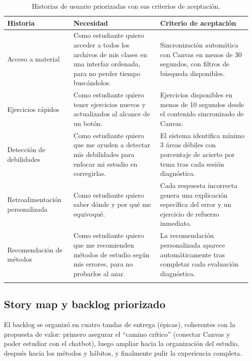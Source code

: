 \documentclass[11pt,a4paper]{article}
\begin{document}
\begin{longtable}{@{}p{4.6cm} p{5.4cm} p{4.5cm}@{}}
\toprule
\textbf{Historia} & \textbf{Necesidad} & \textbf{Criterio de aceptaci\'on} \\
\midrule
\endhead
Acceso a material & Como estudiante quiero acceder a todos los archivos de mis clases en una interfaz ordenada, para no perder tiempo busc\'andolos. & Sincronizaci\'on autom\'atica con Canvas en menos de 30 segundos, con filtros de b\'usqueda disponibles. \\
Ejercicios r\'apidos & Como estudiante quiero tener ejercicios nuevos y actualizados al alcance de un bot\'on. & Ejercicios disponibles en menos de 10 segundos desde el contenido sincronizado de Canvas. \\
Detecci\'on de debilidades & Como estudiante quiero que me ayuden a detectar mis debilidades para enfocar mi estudio en corregirlas. & El sistema identifica m\'inimo 3 \'areas d\'ebiles con porcentaje de acierto por tema tras cada sesi\'on diagn\'ostica. \\
Retroalimentaci\'on personalizada & Como estudiante quiero saber d\'onde y por qu\'e me equivoqu\'e. & Cada respuesta incorrecta genera una explicaci\'on espec\'ifica del error y un ejercicio de refuerzo inmediato. \\
Recomendaci\'on de m\'etodos & Como estudiante quiero que me recomienden m\'etodos de estudio seg\'un mis errores, para no probarlos al azar. & La recomendaci\'on personalizada aparece autom\'aticamente tras completar cada evaluaci\'on diagn\'ostica. \\
\bottomrule
\caption{Historias de usuario priorizadas con sus criterios de aceptaci\'on.}
\end{longtable}

\subsection{Story map y backlog priorizado}

El backlog se organiz\'o en cuatro tandas de entrega (\'epicas), coherentes con la propuesta de valor: primero asegurar el ``camino cr\'itico'' (conectar Canvas y poder estudiar con el chatbot), luego ampliar hacia la organizaci\'on del estudio, despu\'es hacia los m\'etodos y h\'abitos, y finalmente pulir la experiencia completa.
\end{document}
